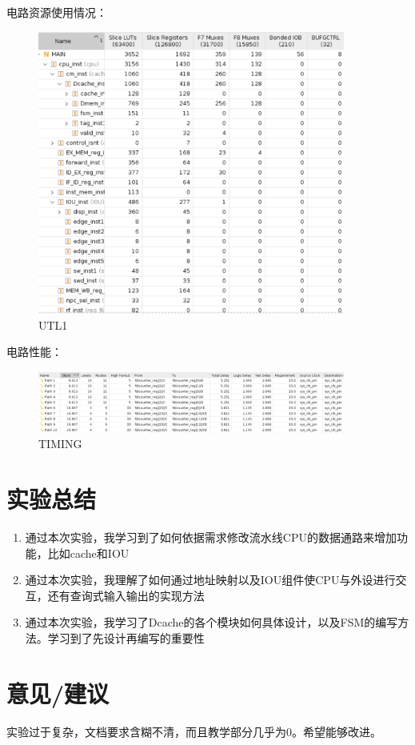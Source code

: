 \documentclass[a4paper]{article}
\begin{document}
电路资源使用情况：
\begin{figure}[H]
    \centering
    \includegraphics[width=0.9\textwidth]{2.png}
    \caption{UTL1}
    \label{fig:test1}
\end{figure}


电路性能：
\begin{figure}[H]
    \centering
    \includegraphics[width=0.9\textwidth]{4.png}
    \caption{TIMING}
    \label{fig:test1}
\end{figure}

\section {实验总结}
\begin{enumerate}
  \item 通过本次实验，我学习到了如何依据需求修改流水线CPU的数据通路来增加功能，比如cache和IOU
  \item 通过本次实验，我理解了如何通过地址映射以及IOU组件使CPU与外设进行交互，还有查询式输入输出的实现方法
  \item 通过本次实验，我学习了Dcache的各个模块如何具体设计，以及FSM的编写方法。学习到了先设计再编写的重要性
\end{enumerate}
\section {意见/建议}
    实验过于复杂，文档要求含糊不清，而且教学部分几乎为0。希望能够改进。
\end{document}
